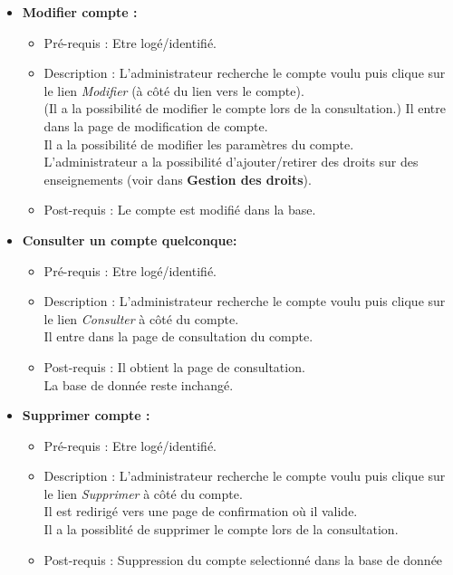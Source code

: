 \begin{itemize}
\item  {\bf Modifier compte :}
	\begin{itemize}
	\item Pr{\'e}-requis : Etre log{\'e}/identifi{\'e}. 
	\item Description : L'administrateur recherche
	le compte voulu puis clique sur le lien {\it
	Modifier} ({\`a} c{\^o}t{\'e} du lien vers le compte).\\
	(Il a la possibilit{\'e} de modifier le compte lors
	de la consultation.)
	Il entre dans la page de modification de compte.\\
	Il a la possibilit{\'e} de modifier les param{\`e}tres
	du compte.\\
	L'administrateur a la possibilit{\'e}
	d'ajouter/retirer des droits sur des
	enseignements (voir dans {\bf Gestion des droits}).
	\item Post-requis : Le compte est modifi{\'e} dans la base. 
	\end{itemize}

\item  {\bf Consulter un compte quelconque:}
	\begin{itemize}
	\item Pr{\'e}-requis : Etre log{\'e}/identifi{\'e}. 
	\item Description : L'administrateur recherche
	le compte voulu puis clique sur le lien {\it
	Consulter} {\`a} c{\^o}t{\'e} du compte.\\
	Il entre dans la page de consultation du compte.
	\item Post-requis : Il obtient la page de consultation.\\
	La base de donn{\'e}e reste inchang{\'e}.
	\end{itemize}

\item  {\bf Supprimer compte :}
	\begin{itemize}
	\item Pr{\'e}-requis : Etre log{\'e}/identifi{\'e}.
	\item Description : L'administrateur recherche
	le compte voulu puis clique sur le lien {\it
	Supprimer} {\`a} c{\^o}t{\'e} du compte.\\
	Il est redirig{\'e} vers une page de
	confirmation o{\`u} il valide.\\ Il a la
	possiblit{\'e} de supprimer le compte lors de la consultation.
	\item Post-requis : Suppression du compte
	selectionn{\'e} dans la base de donn{\'e}e\\
	\end{itemize}
\end{itemize}
